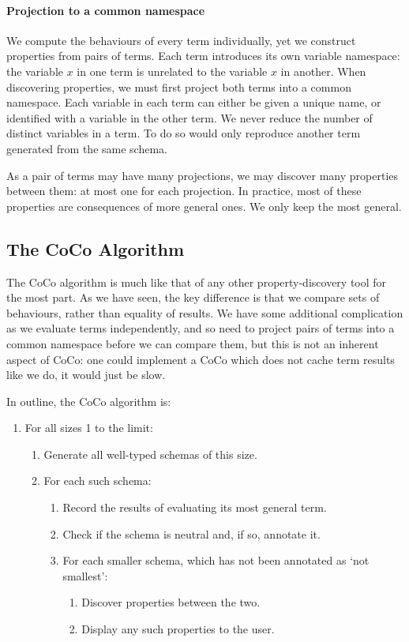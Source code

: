 \paragraph{Projection to a common namespace}
We compute the behaviours of every term individually, yet we construct
properties from pairs of terms.  Each term introduces its own variable
namespace: the variable $x$ in one term is unrelated to the variable
$x$ in another.  When discovering properties, we must first project
both terms into a common namespace.  Each variable in each term can
either be given a unique name, or identified with a variable in the
other term.  We never reduce the number of distinct variables in a
term.  To do so would only reproduce another term generated from the
same schema.

As a pair of terms may have many projections, we may discover many
properties between them: at most one for each projection.  In
practice, most of these properties are consequences of more general
ones.  We only keep the most general.

\subsection{The CoCo Algorithm}
\label{sec:coco-hiw-algo}

The CoCo algorithm is much like that of any other property-discovery
tool for the most part.  As we have seen, the key difference is that
we compare sets of behaviours, rather than equality of results.  We
have some additional complication as we evaluate terms independently,
and so need to project pairs of terms into a common namespace before
we can compare them, but this is not an inherent aspect of CoCo: one
could implement a CoCo which does not cache term results like we do,
it would just be slow.

In outline, the CoCo algorithm is:

\begin{enumerate}
\item For all sizes 1 to the limit:
  \begin{enumerate}
  \item Generate all well-typed schemas of this size.
  \item For each such schema:
    \begin{enumerate}
    \item Record the results of evaluating its most general term.
    \item Check if the schema is neutral and, if so, annotate it.
    \item For each smaller schema, which has not been annotated as
      `not smallest':
      \begin{enumerate}
      \item Discover properties between the two.
      \item Display any such properties to the user.
      \end{enumerate}
    \end{enumerate}
  \end{enumerate}
\end{enumerate}

